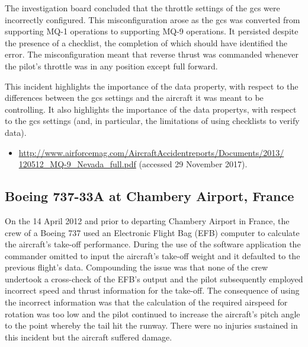 The investigation board concluded that the throttle settings of the \gls{gcs} were incorrectly configured. This misconfiguration arose as the \gls{gcs} was converted from supporting MQ-1 operations to supporting MQ-9 operations. It persisted despite the presence of a checklist, the completion of which should have identified the error. The misconfiguration meant that reverse thrust was commanded whenever the pilot's throttle was in any position except full forward.

This incident highlights the importance of the  \gls{data property}, with respect to the differences between the \gls{gcs} settings and the aircraft it was meant to be controlling. It also highlights the importance of the  \glspl{data property}, with respect to the \gls{gcs} settings (and, in particular, the limitations of using checklists to verify data).

\begin{samepage}
\begin{itemize}
	\item \raggedright{\href{http://www.airforcemag.com/AircraftAccidentreports/Documents/2013/120512_MQ-9_Nevada_full.pdf}{http://www.airforcemag.com/AircraftAccidentreports/Documents/2013/ 120512\_MQ-9\_Nevada\_full.pdf} (accessed 29 November 2017).}
\end{itemize}
\end{samepage}


\subsection{Boeing 737-33A at Chambery Airport, France} \label{bkm:incacc:737-33A} 
On the 14 April 2012 and prior to departing Chambery Airport in France, the crew of a Boeing 737 used an Electronic Flight Bag (EFB) computer to calculate the aircraft’s take-off performance. During the use of the software application the commander omitted to input the aircraft’s take-off weight and it defaulted to the previous flight’s data. Compounding the issue was that none of the crew undertook a cross-check of the EFB’s output and the pilot subsequently employed incorrect speed and thrust \gls{information} for the take-off. The consequence of using the incorrect \gls{information} was that the calculation of the required airspeed for rotation was too low and the pilot continued to increase the aircraft’s pitch angle to the point whereby the tail hit the runway. There were no injuries sustained in this incident but the aircraft suffered damage.

